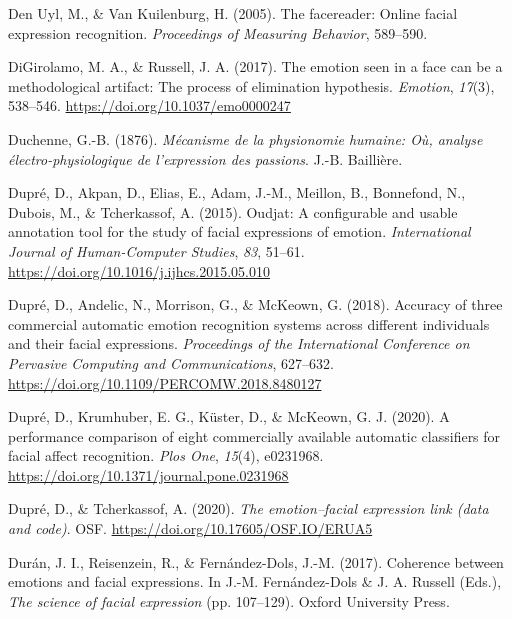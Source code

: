 \documentclass[
  english,
  man]{apa7}
\newlength{\cslhangindent}
\newenvironment{cslreferences}%
  {\setlength{\parindent}{0pt}%
  \everypar{\setlength{\hangindent}{\cslhangindent}}\ignorespaces}%
  {\par}
\begin{document}
\begin{cslreferences}
\leavevmode\hypertarget{ref-den2005facereader}{}%
Den Uyl, M., \& Van Kuilenburg, H. (2005). The facereader: Online facial expression recognition. \emph{Proceedings of Measuring Behavior}, 589--590.

\leavevmode\hypertarget{ref-digirolamo2017emotion}{}%
DiGirolamo, M. A., \& Russell, J. A. (2017). The emotion seen in a face can be a methodological artifact: The process of elimination hypothesis. \emph{Emotion}, \emph{17}(3), 538--546. \url{https://doi.org/10.1037/emo0000247}

\leavevmode\hypertarget{ref-duchenne1876mecanisme}{}%
Duchenne, G.-B. (1876). \emph{Mécanisme de la physionomie humaine: Où, analyse électro-physiologique de l'expression des passions}. J.-B. Baillière.

\leavevmode\hypertarget{ref-dupre2015oudjat}{}%
Dupré, D., Akpan, D., Elias, E., Adam, J.-M., Meillon, B., Bonnefond, N., Dubois, M., \& Tcherkassof, A. (2015). Oudjat: A configurable and usable annotation tool for the study of facial expressions of emotion. \emph{International Journal of Human-Computer Studies}, \emph{83}, 51--61. \url{https://doi.org/10.1016/j.ijhcs.2015.05.010}

\leavevmode\hypertarget{ref-dupre2018accuracy}{}%
Dupré, D., Andelic, N., Morrison, G., \& McKeown, G. (2018). Accuracy of three commercial automatic emotion recognition systems across different individuals and their facial expressions. \emph{Proceedings of the International Conference on Pervasive Computing and Communications}, 627--632. \url{https://doi.org/10.1109/PERCOMW.2018.8480127}

\leavevmode\hypertarget{ref-dupre2020performance}{}%
Dupré, D., Krumhuber, E. G., Küster, D., \& McKeown, G. J. (2020). A performance comparison of eight commercially available automatic classifiers for facial affect recognition. \emph{Plos One}, \emph{15}(4), e0231968. \url{https://doi.org/10.1371/journal.pone.0231968}

\leavevmode\hypertarget{ref-Dupruxe9_Tcherkassof_2020}{}%
Dupré, D., \& Tcherkassof, A. (2020). \emph{The emotion--facial expression link (data and code)}. OSF. \url{https://doi.org/10.17605/OSF.IO/ERUA5}

\leavevmode\hypertarget{ref-duran2017coherence}{}%
Durán, J. I., Reisenzein, R., \& Fernández-Dols, J.-M. (2017). Coherence between emotions and facial expressions. In J.-M. Fernández-Dols \& J. A. Russell (Eds.), \emph{The science of facial expression} (pp. 107--129). Oxford University Press.


\end{cslreferences}
\end{document}
